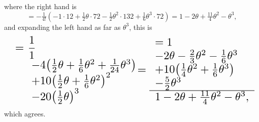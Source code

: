 \documentclass[11pt]{article}
\begin{document}
where the right hand is
\[
= -\tfrac{1}{4!}(-1\cdot 12 + \tfrac{1}{2}\theta\cdot 72 - \tfrac{1}{2}\theta^{2}\cdot 132 + \tfrac{1}{6}\theta^{3}\cdot 72)
= 1 - 2\theta + \tfrac{11}{4}\theta^{2} - \theta^{3},
\]
and expanding the left hand as far as $\theta^{3}$, this is
\[ \resizebox{\textwidth}{!}{$\displaystyle
\begin{array}{rl}
=&\!\!\!\!\dfrac{1}{1}\\
&\!\!-4\bigl(\tfrac{1}{2}\theta + \tfrac{1}{6}\theta^{2} + \tfrac{1}{24}\theta^{3}\bigr)\\
&\!\!+10\bigl(\tfrac{1}{2}\theta + \tfrac{1}{6}\theta^{2}\bigr)^{2}\\
&\!\!-20\bigl(\tfrac{1}{2}\theta\bigr)^{3}
\end{array}\!\!\!\!
=
\begin{array}{l}
=1\\
-2\theta - \tfrac{2}{3}\theta^{2} - \tfrac{1}{6}\theta^{3}\\
+10\bigl(\tfrac{1}{4}\theta^{2} + \tfrac{1}{6}\theta^{3}\bigr)\\
-\tfrac{5}{2}\theta^{3}\\\hline
1 - 2\theta + \tfrac{11}{4}\theta^{2} - \theta^{3},
\end{array}
$} \]
which agrees.
\end{document}
